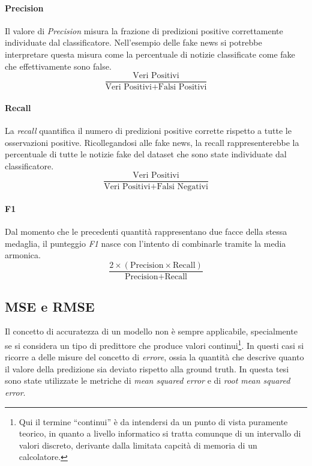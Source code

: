 \documentclass[12pt]{report}
\theoremstyle{definition}
\begin{document}
\paragraph{Precision}
Il valore di \textit{Precision} misura la frazione di predizioni positive correttamente individuate dal classificatore. Nell'esempio delle fake news si potrebbe interpretare questa misura come la percentuale di notizie classificate come fake che effettivamente sono false.
\begin{equation}
\frac{\text{Veri Positivi}}{\text{Veri Positivi} + \text{Falsi Positivi}}
\end{equation}

\paragraph{Recall}
La \textit{recall} quantifica il numero di predizioni positive corrette rispetto a tutte le osservazioni positive. Ricollegandosi alle fake news, la recall rappresenterebbe la percentuale di tutte le notizie fake del dataset che sono state individuate dal classificatore.
\begin{equation}
\frac{\text{Veri Positivi}}{\text{Veri Positivi} + \text{Falsi Negativi}}
\end{equation}

\paragraph{F1}
Dal momento che le precedenti quantità rappresentano due facce della stessa medaglia, il punteggio \textit{F1} nasce con l'intento di combinarle tramite la media armonica.
\begin{equation}
\frac{2 \times (\text{Precision} \times \text{Recall})}{\text{Precision} + \text{Recall}}
\end{equation}

\subsection{MSE e RMSE}\label{erroreregr}
Il concetto di accuratezza di un modello non è sempre applicabile, specialmente se si considera un tipo di predittore che produce valori continui\footnote{Qui il termine ``continui'' è da intendersi da un punto di vista puramente teorico, in quanto a livello informatico si tratta comunque di un intervallo di valori discreto, derivante dalla limitata capcità di memoria di un calcolatore.}. In questi casi si ricorre a delle misure del concetto di \textit{errore}, ossia la quantità che descrive quanto il valore della predizione sia deviato rispetto alla ground truth.
In questa tesi sono state utilizzate le metriche di \textit{mean squared error} e di \textit{root mean squared error}.
\end{document}
